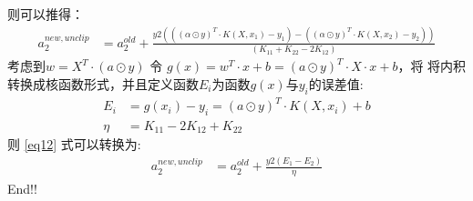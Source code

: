 \documentclass[12pt, a4paper, oneside]{ctexart}
\begin{document}
则可以推得：
\begin{align}      
    a_2^{new,unclip} &= a_2^{old} + \frac{y2(((\alpha \odot y)^T \cdot K(X, x_1) - y_1) - ((\alpha \odot y)^T \cdot K(X, x_2)-y_2))}{(K_{11} + K_{22} - 2K_{12})} \label{eq12} 
\end{align}
考虑到$ w = X^T \cdot (a \odot y) $ 令 $ g(x) = w^T \cdot x + b = (a \odot y)^T \cdot X \cdot x + b$，将
将内积转换成核函数形式，并且定义函数$E_i$为函数$g(x)$与$y_i$的误差值:
\begin{align*}
    E_i &= g(x_i) - y_i  = (a \odot y)^T \cdot K(X, x_i) + b \\
    \eta &= K_{11} - 2K_{12} + K_{22}
\end{align*}
则 \eqref{eq12} 式可以转换为:
\begin{align}      
    a_2^{new,unclip} &= a_2^{old} + \frac{y2(E_1 - E_2)}{\eta} \label{eq13} 
\end{align}
End!!
\end{document}
